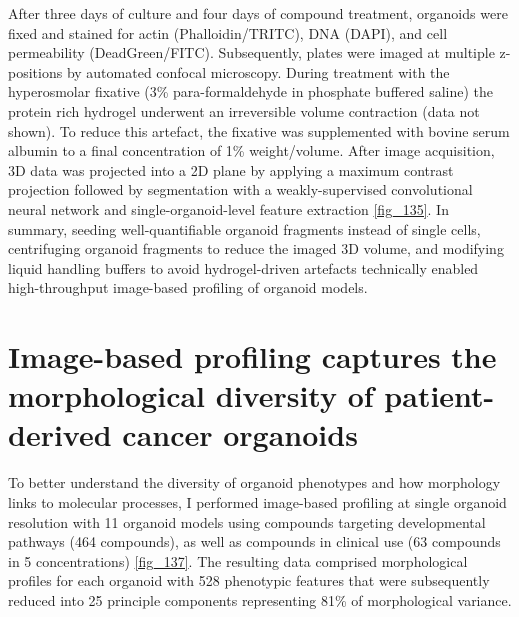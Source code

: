 \begin{flushleft}
\bigbreak

After three days of culture and four days of compound treatment, organoids were fixed and stained for actin (Phalloidin/TRITC), DNA (DAPI), and cell permeability (DeadGreen/FITC). Subsequently, plates were imaged at multiple z-positions by automated confocal microscopy. During treatment with the hyperosmolar fixative (3\% para-formaldehyde in phosphate buffered saline) the protein rich hydrogel underwent an irreversible volume contraction (data not shown). To reduce this artefact, the fixative was supplemented with bovine serum albumin to a final concentration of 1\% weight/volume. After image acquisition, 3D data was projected into a 2D plane by applying a maximum contrast projection followed by segmentation with a weakly-supervised convolutional neural network and single-organoid-level feature extraction \ref{fig_135}. In summary, seeding well-quantifiable organoid fragments instead of single cells, centrifuging organoid fragments to reduce the imaged 3D volume, and modifying liquid handling buffers to avoid hydrogel-driven artefacts technically enabled high-throughput image-based profiling of organoid models. 


\section{Image-based profiling captures the morphological diversity of patient-derived cancer organoids}

To better understand the diversity of organoid phenotypes and how morphology links to molecular processes, I performed image-based profiling at single organoid resolution with 11 organoid models using compounds targeting developmental pathways (464 compounds), as well as compounds in clinical use (63 compounds in 5 concentrations) \ref{fig_137}. The resulting data comprised morphological profiles for each organoid with 528 phenotypic features  that were subsequently reduced into 25 principle components representing 81\% of morphological variance.


\end{flushleft}
